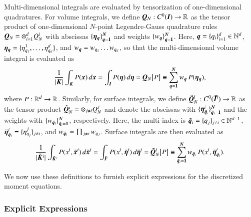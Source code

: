 \documentclass[11pt,letterpaper,twoside,english,final]{article}
\begin{document}
Multi-dimensional integrals are evaluated by tensorization of one-dimensional quadratures.  
For volume integrals, we define $\boldsymbol{Q}_{N}:C^{0}(\boldsymbol{I})\to\mathbb{R}$ as the tensor product of one-dimensional $N$-point Legendre-Gauss quadrature rules $\boldsymbol{Q}_{N}=\otimes_{i=1}^{d}Q_{N}^{i}$ with abscissas $\{\boldsymbol{\eta}_{\boldsymbol{q}}\}_{\boldsymbol{q}=\boldsymbol{1}}^{\boldsymbol{N}}$ and weights $\{w_{\boldsymbol{q}}\}_{\boldsymbol{q}=\boldsymbol{1}}^{\boldsymbol{N}}$.  
Here, $\boldsymbol{q}=\{q_{i}\}_{i=1}^{d}\in\mathbb{N}^{d}$, $\boldsymbol{\eta}_{\boldsymbol{q}}=\{\eta_{q_{1}}^{1},\ldots,\eta_{q_{d}}^{d}\}$, and $w_{\boldsymbol{q}}=w_{q_{1}}\ldots w_{q_{d}}$, so that the multi-dimensional volume integral is evaluated as
\begin{equation}
  \frac{1}{|\boldsymbol{K}|}\int_{\boldsymbol{K}}P(\boldsymbol{x})\,d\boldsymbol{x}
  =\int_{\boldsymbol{I}}P(\boldsymbol{\eta})\,d\boldsymbol{\eta}
  =\boldsymbol{Q}_{N}\big[P\big]
  \equiv\sum_{\boldsymbol{q}=\boldsymbol{1}}^{\boldsymbol{N}}w_{\boldsymbol{q}}\,P(\boldsymbol{\eta}_{\boldsymbol{q}}),
\end{equation}
where $P:\mathbb{R}^{d}\to\mathbb{R}$.  
Similarly, for surface integrals, we define $\tilde{\boldsymbol{Q}}_{N}^{i}:C^{0}(\tilde{\boldsymbol{I}}^{i})\to\mathbb{R}$ as the tensor product $\tilde{\boldsymbol{Q}}_{N}^{i}=\otimes_{j\ne i}Q_{N}^{j}$ and denote the abscissas with $\{\tilde{\boldsymbol{\eta}}_{\tilde{\boldsymbol{q}}_{i}}^{i}\}_{\tilde{\boldsymbol{q}}_{i}=\boldsymbol{1}}^{\boldsymbol{N}}$ and the weights with $\{w_{\tilde{\boldsymbol{q}}_{i}}\}_{\tilde{\boldsymbol{q}}_{i}=\boldsymbol{1}}^{\boldsymbol{N}}$, respectively.  
Here, the multi-index is $\tilde{\boldsymbol{q}}_{i}=\{q_{j}\}_{j\ne i}\in\mathbb{N}^{d-1}$, $\tilde{\boldsymbol{\eta}}_{\tilde{\boldsymbol{q}}_{i}}^{i}=\{\eta_{q_{j}}^{j}\}_{j\ne i}$, and $w_{\tilde{\boldsymbol{q}}_{i}}=\prod_{j\ne i}w_{q_{j}}$.  
Surface integrals are then evaluated as
\begin{equation}
  \frac{1}{|\tilde{\boldsymbol{K}}^{i}|}\int_{\tilde{\boldsymbol{K}}^{i}}P(x^{i},\tilde{\boldsymbol{x}}^{i})\,d\tilde{\boldsymbol{x}}^{i}
  =\int_{\tilde{\boldsymbol{I}}^{i}}P(x^{i},\tilde{\boldsymbol{\eta}}^{i})\,d\tilde{\boldsymbol{\eta}}^{i}
  =\tilde{\boldsymbol{Q}}_{N}^{i}\big[P\big]
  \equiv\sum_{\tilde{\boldsymbol{q}}_{i}=\boldsymbol{1}}^{\boldsymbol{N}}w_{\tilde{\boldsymbol{q}}_{i}}\,P(x^{i},\tilde{\boldsymbol{\eta}}_{\tilde{\boldsymbol{q}_{i}}}^{i}).  
\end{equation}

We now use these definitions to furnish explicit expressions for the discretized moment equations.  

\subsubsection{Explicit Expressions}
\end{document}
